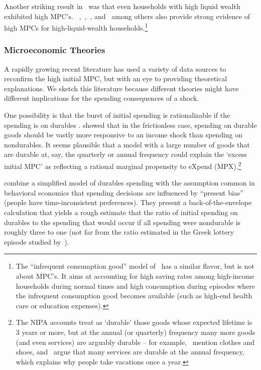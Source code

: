 \documentclass[\PathToRoot/\ProjectName]{subfiles}
\begin{document}
Another striking result in~\cite{fagereng-mpc-2021} was that even households with high liquid wealth exhibited high MPC's. ~\cite{boehm2025fivefacts},~\cite{graham2024mental},~\cite{crawley2023MicroMacro}, and~\cite{kueng2018excess} among others also provide strong evidence of high MPCs for high-liquid-wealth households.\footnote{The ``infrequent consumption good'' model of~\cite{melcangiStock} has a similar flavor, but is not about MPC's.  It aims at accounting for high saving rates among high-income households during normal times and high consumption during episodes where the infrequent consumption good becomes available (such as high-end health care or education expenses).}

\whenintegrated{\label{microeconomic-theories}}
\subsubsection{Microeconomic Theories}

A rapidly growing recent literature has used a variety of data sources to reconfirm the high initial MPC, but with an eye to providing theoretical explanations. We sketch this literature because different theories might have different implications for the spending consequences of a shock.

One possibility is that the burst of initial spending is rationalizable if the spending is on durables \citep{bcShocksStocks}.
\cite{mankiw:durgoods} showed that in the frictionless case, spending on durable goods should be vastly more responsive to an income shock than spending on nondurables.
It seems plausible that a model with a large number of goods that are durable at, say, the quarterly or annual frequency could explain the `excess initial MPC' as reflecting a rational marginal propensity to eXpend (MPX).\footnote{The NIPA accounts treat as `durable' those goods whose expected lifetime is 3 years or more, but at the annual (or quarterly) frequency many more goods (and even services) are arguably durable -- for example,~\cite{bdTimeSeriesC} mention clothes and shoes, and~\cite{hkpMemorable} argue that many services are durable at the annual frequency, which explains why people take vacations once a year.}

\cite{lmmPresentBias} combine a simplified model of durables spending with the assumption common in behavioral economics that spending decisions are influenced by ``present bias'' (people have time-inconsistent preferences).  They present a back-of-the-envelope calculation that yields a rough estimate that the ratio of initial spending on durables to the spending that would occur if all spending were nondurable is roughly three to one (not far from the ratio estimated in the Greek lottery episode studied by~\cite{kotsogiannisMPCs}).
\end{document}
